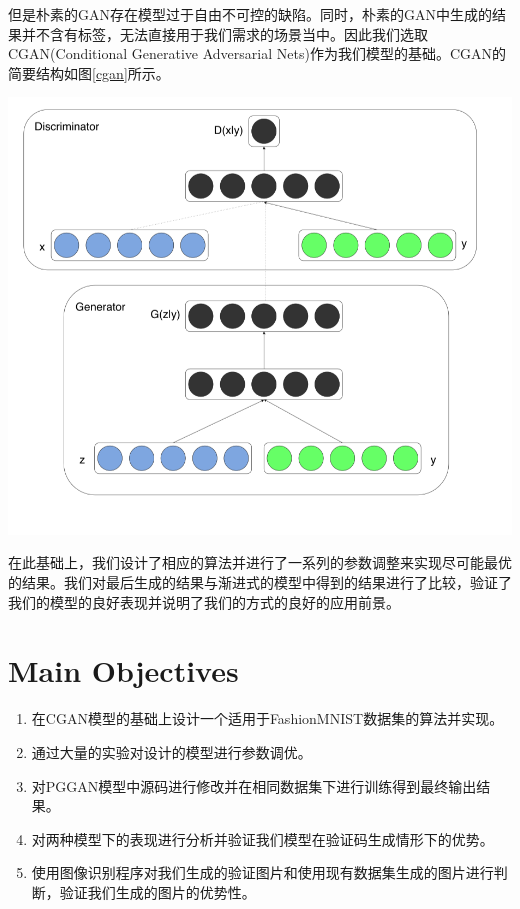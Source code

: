 \documentclass[12pt]{article}
\begin{document}

 但是朴素的GAN存在模型过于自由不可控的缺陷。同时，朴素的GAN中生成的结果并不含有标签，无法直接用于我们需求的场景当中。因此我们选取CGAN\supercite{DBLP:journals/corr/MirzaO14}(Conditional Generative Adversarial Nets)作为我们模型的基础。CGAN的简要结构如图\ref{cgan}所示。

\begin{center}\vspace{1cm}
\includegraphics[width=0.6\linewidth]{CGAN.png}
\label{cgan}
\end{center}\vspace{1cm}

 在此基础上，我们设计了相应的算法并进行了一系列的参数调整来实现尽可能最优的结果。我们对最后生成的结果与渐进式的模型中得到的结果进行了比较，验证了我们的模型的良好表现并说明了我们的方式的良好的应用前景。

\section*{Main Objectives}

\begin{enumerate}
\item 在CGAN模型的基础上设计一个适用于FashionMNIST数据集的算法并实现。
\item 通过大量的实验对设计的模型进行参数调优。
\item 对PGGAN模型中源码进行修改并在相同数据集下进行训练得到最终输出结果。
\item 对两种模型下的表现进行分析并验证我们模型在验证码生成情形下的优势。
\item 使用图像识别程序对我们生成的验证图片和使用现有数据集生成的图片进行判断，验证我们生成的图片的优势性。
\end{enumerate}
\end{document}
